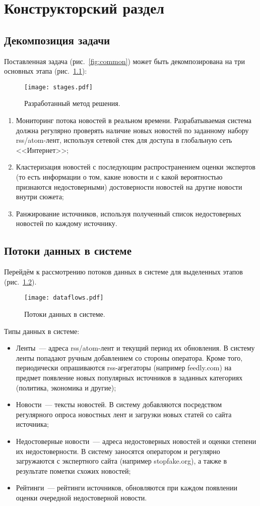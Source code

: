 \chapter{Конструкторский раздел}
\section{Декомпозиция задачи}
Поставленная задача (рис.~\ref{fig:common}) может быть декомпозирована на три основных этапа (рис.~\ref{fig:stages}):
\begin{figure}[h]
    \centering
    \texttt{[image: stages.pdf]}
    \caption{Разработанный метод решения.}
    \label{fig:stages}
\end{figure}

\begin{enumerate}
    \item Мониторинг потока новостей в реальном времени. Разрабатываемая система должна регулярно проверять наличие новых новостей по заданному набору rss/atom-лент, используя сетевой стек для доступа в глобальную сеть <<Интернет>>;
    \item Кластеризация новостей с последующим распространением оценки экспертов (то есть информации о том, какие новости и с какой вероятностью признаются недостоверными) достоверности новостей на другие новости внутри сюжета;
    \item Ранжирование источников, используя полученный список недостоверных новостей по каждому источнику.
\end{enumerate}

\section{Потоки данных в системе}
Перейдём к рассмотрению потоков данных в системе для выделенных этапов (рис.~\ref{fig:dataflows}).
\begin{figure}[h]
    \centering
    \texttt{[image: dataflows.pdf]}
    \caption{Потоки данных в системе.}
    \label{fig:dataflows}
\end{figure}

Типы данных в системе:
\begin{itemize}
\item Ленты~--- адреса rss/atom-лент и текущий период их обновления. В систему ленты попадают ручным добавлением со стороны оператора. Кроме того, периодически опрашиваются rss-агрегаторы (например feedly.com) на предмет появление новых популярных источников в заданных категориях (политика, экономика и другие);
    \item Новости~--- тексты новостей. В систему добавляются посредством регулярного опроса новостных лент и загрузки новых статей со сайта источника;
    \item Недостоверные новости~--- адреса недостоверных новостей и оценки степени их недостоверности. В систему заносятся оператором и регулярно загружаются с экспертного сайта (например stopfake.org), а также в результате пометки схожих новостей;
    \item Рейтинги~--- рейтинги источников, обновляются при каждом появлении оценки очередной недостоверной новости.
\end{itemize}

